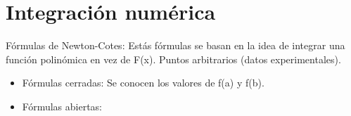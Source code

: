 \chapter{Integraci\'on num\'erica}
F\'ormulas de Newton-Cotes: Est\'as f\'ormulas se basan en la idea de integrar una funci\'on polin\'omica en vez de F(x). Puntos arbitrarios (datos experimentales).\\
\begin{itemize}
\item F\'ormulas cerradas: Se conocen los valores de f(a) y f(b).
\item F\'ormulas abiertas:
\end{itemize}


